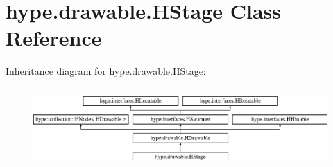 \hypertarget{classhype_1_1drawable_1_1_h_stage}{\section{hype.\-drawable.\-H\-Stage Class Reference}
\label{classhype_1_1drawable_1_1_h_stage}
}
Inheritance diagram for hype.\-drawable.\-H\-Stage\-:\begin{figure}[H]
\begin{center}
\leavevmode
\includegraphics[height=3.111111cm]{classhype_1_1drawable_1_1_h_stage}
\end{center}
\end{figure}
